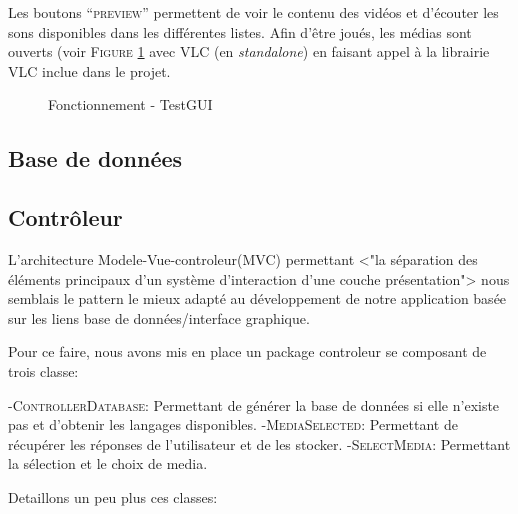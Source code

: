 Les boutons ``\textsc{preview}'' permettent de voir le contenu des vidéos et d'écouter les sons disponibles dans les différentes listes. Afin d'être joués, les médias sont ouverts (voir \textsc{Figure} \ref{VLC} avec VLC (en \textit{standalone}) en faisant appel à la librairie VLC inclue dans le projet.

\begin{figure}[!ht]
\begin{center}
  \caption{Fonctionnement - TestGUI}
  \label{VLC} 
\end{center}
\end{figure}

\subsection{Base de données}



\subsection{Contrôleur}

L'architecture Modele-Vue-controleur(MVC) permettant <"la séparation des éléments principaux d'un système d'interaction d'une couche présentation"> nous semblais le pattern le mieux adapté au développement de notre application basée sur les liens base de données/interface graphique.

Pour ce faire, nous avons mis en place un package controleur se composant de trois classe:

	-\textsc{ControllerDatabase}: Permettant de générer la base de données si elle n'existe pas et d'obtenir les langages disponibles.
	-\textsc{MediaSelected}: Permettant de récupérer les réponses de l'utilisateur et de les stocker.
	-\textsc{SelectMedia}: Permettant la sélection et le choix de media.
	
Detaillons un peu plus ces classes:

